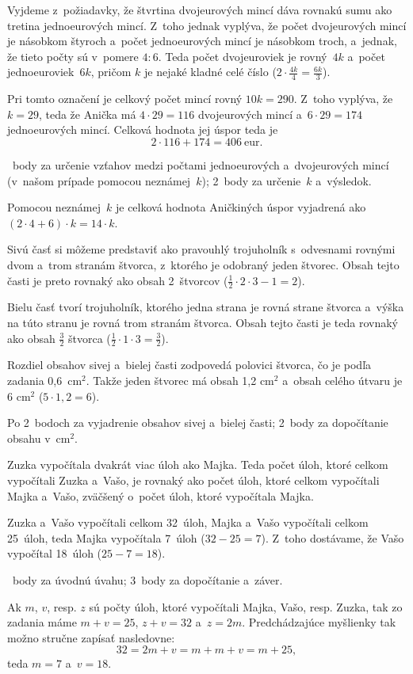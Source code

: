 {%
Vyjdeme z~požiadavky, že štvrtina dvojeurových mincí dáva rovnakú sumu ako tretina jednoeurových mincí.
Z~toho jednak vyplýva, že počet dvojeurových mincí je násobkom štyroch a~počet jednoeurových mincí je násobkom troch, a~jednak, že tieto počty sú v~pomere $4:6$.
Teda počet dvojeuroviek je rovný~$4k$ a~počet jednoeuroviek~$6k$, pričom $k$ je nejaké kladné celé číslo ($2\cdot\frac{4k}4=\frac{6k}3$).

Pri tomto označení je celkový počet mincí rovný $10k=290$.
Z~toho vyplýva, že $k=29$, teda že Anička má $4\cdot 29=116$ dvojeurových mincí a~$6\cdot 29=174$ jednoeurových mincí.
Celková hodnota jej úspor teda je
$$
2\cdot 116+174 =406\ \text{eur}.
$$

~body za určenie vzťahov medzi počtami jednoeurových a~dvojeurových mincí (v~našom prípade pomocou neznámej~$k$);
2~body za určenie~$k$ a~výsledok.

\poznamka
Pomocou neznámej~$k$ je celková hodnota Aničkiných úspor vyjadrená ako $({2\cdot4}+6)\cdot k=14\cdot k$.
\endhodnotenie
}

{%
Sivú časť si môžeme predstaviť ako pravouhlý trojuholník s~odvesnami rovnými dvom a~trom stranám štvorca, z~ktorého je odobraný jeden štvorec.
Obsah tejto časti je preto rovnaký ako obsah 2~štvorcov ($\frac12\cdot2\cdot3-1=2$).

Bielu časť tvorí trojuholník, ktorého jedna strana je rovná strane štvorca a~výška na túto stranu je rovná trom stranám štvorca.
Obsah tejto časti je teda rovnaký ako obsah $\frac32$ štvorca ($\frac12\cdot1\cdot3=\frac32$).

Rozdiel obsahov sivej a~bielej časti zodpovedá polovici štvorca, čo je podľa zadania 0,6~cm$^2$.
Takže jeden štvorec má obsah 1,2 cm$^2$ a~obsah celého útvaru je 6 cm$^2$ ($5\cdot1{,}2=6$).

\hodnotenie
Po 2~bodoch za vyjadrenie obsahov sivej a~bielej časti;
2~body za dopočítanie obsahu v~cm$^2$.

\endhodnotenie
}

{%
Zuzka vypočítala dvakrát viac úloh ako Majka.
Teda počet úloh, ktoré celkom vypočítali Zuzka a~Vašo, je rovnaký ako počet úloh, ktoré celkom vypočítali Majka a~Vašo, zväčšený o~počet úloh, ktoré vypočítala Majka.

Zuzka a~Vašo vypočítali celkom 32~úloh, Majka a~Vašo vypočítali celkom 25~úloh, teda Majka vypočítala 7~úloh ($32-25=7$).
Z~toho dostávame, že Vašo vypočítal 18~úloh ($25-7=18$).

~body za úvodnú úvahu;
3~body za dopočítanie a~záver.

\poznamka
Ak $m$, $v$, resp. $z$ sú počty úloh, ktoré vypočítali Majka, Vašo, resp. Zuzka, tak zo zadania máme
$m+v=25$, $z+v=32$ a~$z=2m$.
Predchádzajúce myšlienky tak možno stručne zapísať nasledovne:
$$
32=2m+v=m+m+v=m+25,
$$
teda $m=7$ a~$v=18$.
\endhodnotenie
}

